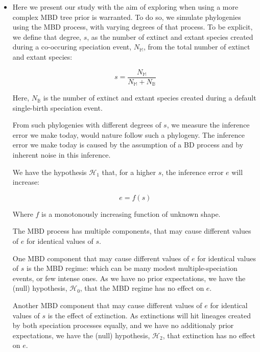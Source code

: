 \begin{itemize}
\item Here we present our study with the aim of exploring 
when using a more complex MBD tree prior is warranted.
To do so, we simulate phylogenies using the MBD process, with
varying degrees of that process. To be explicit, we define
that degree, $s$, as the number of extinct and extant species created
during a co-occuring speciation event, 
$N_{\mathbb{M}}$, from the total number of extinct and extant species:

\begin{equation}
s = \frac{N_{\mathbb{M}}}{N_{\mathbb{M}} + N_{\mathbb{B}}}
\end{equation}


Here, $N_{\mathbb{B}}$ is the number of extinct and extant species created
during a default single-birth speciation event.

From such phylogenies with different degrees of $s$, we measure the
inference error we make today, would nature follow such a phylogeny.
The inference error we make today is caused by the assumption of a BD process
and by inherent noise in this inference. 

We have the hypothesis $\mathcal{H}_1$ that, for a higher $s$, 
the inference error $e$ will increase:

\begin{equation}
e = f(s)
\end{equation} 

Where $f$ is a monotonously increasing function of unknown shape.



The MBD process has multiple components, that may cause 
different values of $e$ for identical values of $s$.

One MBD component that may cause 
different values of $e$ for identical values of $s$
is the MBD regime: which can be many modest 
multiple-speciation events, or few intense ones. 
As we have no prior expectations, we have the (null) hypothesis, 
$\mathcal{H}_0$, that the MBD regime has no effect on $e$.



Another MBD component that may cause 
different values of $e$ for identical values of $s$
is the effect of extinction. 
As extinctions will hit lineages created by both speciation processes equally,
and we have no additionaly prior expectations,
we have the (null) hypothesis, 
$\mathcal{H}_2$, that extinction has no effect on $e$.




\end{itemize}
